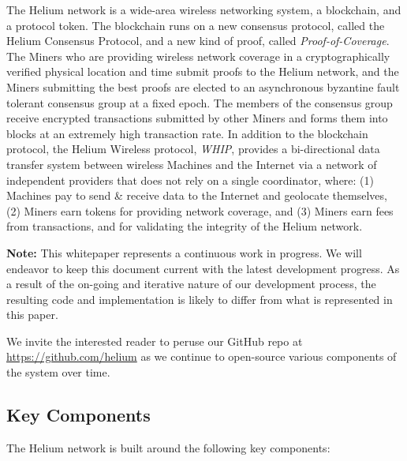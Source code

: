 \documentclass[10pt, nonatbib, nocopyrightspace, reprint]{sigplanconf}
\begin{document}
The Helium network is a wide-area wire\-less net\-working system, a block\-chain, and a protocol token. The blockchain runs on a new consensus protocol, called the Helium Consensus Protocol, and a new kind of proof, called \emph{Proof-of-Coverage}. The Miners who are providing wireless network coverage in a cryptographically verified physical location and time submit proofs to the Helium network, and the Miners submitting the best proofs are elected to an asynchronous byzantine fault tolerant consensus group at a fixed epoch. The members of the consensus group receive encrypted transactions submitted by other Miners and forms them into blocks at an extremely high transaction rate. In addition to the blockchain protocol, the Helium Wireless protocol, \emph{WHIP}, provides a bi-directional data transfer system between wireless Machines and the Internet via a network of independent providers that does not rely on a single coordinator, where: (1) Machines pay to send \& receive data to the Internet and geolocate themselves, (2) Miners earn tokens for providing network coverage, and (3) Miners earn fees from transactions, and for validating the integrity of the Helium network.

\textbf{Note:} This whitepaper represents a continuous work in progress. We will endeavor to keep this document current with the latest development progress. As a result of the on-going and iterative nature of our development process, the resulting code and implementation is likely to differ from what is represented in this paper.

We invite the interested reader to peruse our GitHub repo at \url{https://github.com/helium} as we continue to open-source various components of the system over time.

\subsection{Key Components}

The Helium network is built around the following key components:
\end{document}

